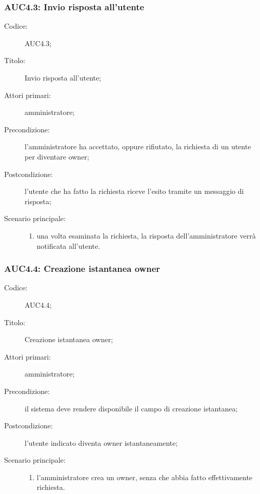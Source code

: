 \documentclass[../../../analisi-dei-requisiti.tex]{subfiles}
\begin{document}
\subsubsection{AUC4.3: Invio risposta all'utente}%
\label{subs:AUC4.3}

\begin{description}
  \item[Codice:] AUC4.3;
  \item[Titolo:] Invio risposta all'utente;
  \item[Attori primari:] amministratore;
  \item[Precondizione:] l'amministratore ha accettato, oppure rifiutato, la richiesta di un utente per diventare owner;
  \item[Postcondizione:] l'utente che ha fatto la richiesta riceve l'esito tramite un messaggio di risposta;
  \item[Scenario principale:]
  \begin{enumerate}
    \item una volta esaminata la richiesta, la risposta dell'amministratore verrà notificata all'utente.
  \end{enumerate}
\end{description}


\subsubsection{AUC4.4: Creazione istantanea owner}%
\label{subs:AUC4.4}

\begin{description}
  \item[Codice:] AUC4.4;
  \item[Titolo:] Creazione istantanea owner;
  \item[Attori primari:] amministratore;
  \item[Precondizione:] il sistema deve rendere disponibile il campo di creazione istantanea;
  \item[Postcondizione:] l'utente indicato diventa owner istantaneamente;
  \item[Scenario principale:]
  \begin{enumerate}
    \item l'amministratore crea un owner, senza che abbia fatto effettivamente richiesta.
  \end{enumerate}
\end{description}
\end{document}
